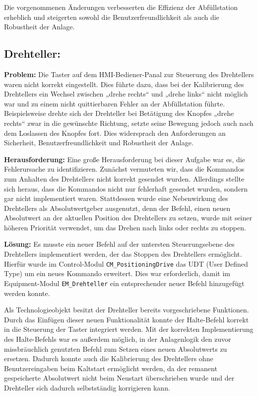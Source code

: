 Die vorgenommenen Änderungen verbesserten die Effizienz der Abfüllstation erheblich und steigerten sowohl die Benutzerfreundlichkeit als 
auch die Robustheit der Anlage.

\subsection{Drehteller:} 

\textbf{Problem:}  
Die Taster auf dem HMI-Bediener-Panal zur Steuerung des Drehtellers waren nicht korrekt eingestellt. Dies führte dazu, dass bei der Kalibrierung des Drehtellers ein 
Wechsel zwischen „drehe rechts“ und „drehe links“ nicht möglich war und zu einem nicht quittierbaren Fehler an der Abfüllstation führte. 
Beispielsweise drehte sich der Drehteller bei Betätigung des Knopfes „drehe rechts“ zwar in die gewünschte Richtung, setzte seine Bewegung 
jedoch auch nach dem Loslassen des Knopfes fort. Dies widersprach den Anforderungen an Sicherheit, Benutzerfreundlichkeit und Robustheit 
der Anlage.  

\textbf{Herausforderung:}  
Eine große Herausforderung bei dieser Aufgabe war es, die Fehlerursache zu identifizieren. Zunächst vermuteten wir, dass die Kommandos zum 
Anhalten des Drehtellers nicht korrekt gesendet wurden. Allerdings stellte sich heraus, dass die Kommandos nicht nur fehlerhaft gesendet wurden, 
sondern gar nicht implementiert waren. Stattdessen wurde eine Nebenwirkung des Drehtellers als Absolutwertgeber ausgenutzt, denn der Befehl, einen 
neuen Absolutwert an der aktuellen Position des Drehtellers zu setzen, wurde mit seiner höheren Priorität verwendet, um das Drehen nach links 
oder rechts zu stoppen.  

\textbf{Lösung:}  
Es musste ein neuer Befehl auf der untersten Steuerungsebene des Drehtellers implementiert werden, der das Stoppen des Drehtellers ermöglicht. 
Hierfür wurde im Control-Modul \texttt{CM\_PositioningDrive} das UDT (User Defined Type) um ein neues Kommando erweitert. Dies war erforderlich, 
damit im Equipment-Modul \texttt{EM\_Drehteller} ein entsprechender neuer Befehl hinzugefügt werden konnte.  

Als Technologieobjekt besitzt der Drehteller bereits vorgeschriebene Funktionen. Durch das Einfügen dieser neuen Funktionalität konnte der 
Halte-Befehl korrekt in die Steuerung der Taster integriert werden. Mit der korrekten Implementierung des 
Halte-Befehls war es außerdem möglich, in der Anlagenlogik den zuvor missbräuchlich genutzten Befehl zum Setzen eines neuen Absolutwerts zu 
ersetzen. Dadurch konnte auch die Kalibrierung des Drehtellers ohne Benutzereingaben beim Kaltstart ermöglicht werden, da der remanent gespeicherte Absolutwert nicht beim Neustart überschrieben wurde und der Drehteller sich dadurch selbstständig korrigieren kann.  

